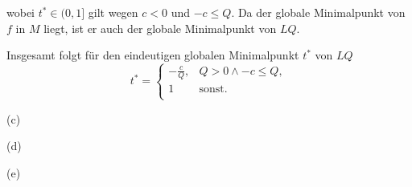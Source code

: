 \documentclass[ngerman, a4paper,12pt]{article}
\begin{document}
wobei $t^* \in (0,1]$ gilt wegen $c<0$ und $-c\leq Q$. Da der globale Minimalpunkt von $f$ in $M$ liegt, ist er auch der globale Minimalpunkt von $LQ$. \par
Insgesamt folgt für den eindeutigen globalen Minimalpunkt $t^*$ von $LQ$
\begin{equation*}
	t^* = 
		\begin{cases}
		-\frac{c}{Q},& Q>0 \land -c \leq Q,\\
		1 & \text{sonst}.\\
	\end{cases}
\end{equation*}
\par
(c) 
\par
(d) 
\par
(e)
\par
\end{document}
